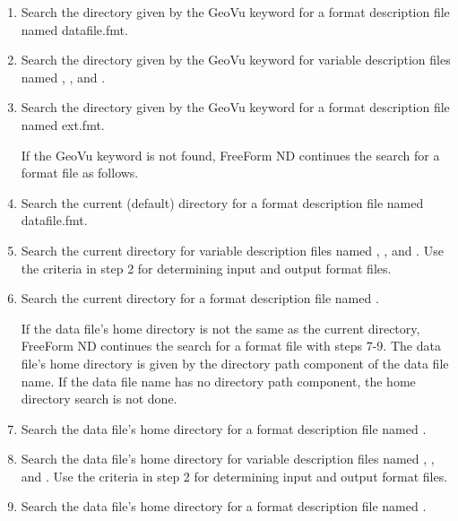 \begin{enumerate}
\item Search the directory given by the GeoVu keyword  for a
  format description file named datafile.fmt.
  
\item Search the directory given by the GeoVu keyword  for
  variable description files named , , and
  .
  
  
\item Search the directory given by the GeoVu keyword  for a
  format description file named ext.fmt.
  
  If the GeoVu keyword  is not found, FreeForm ND continues
  the search for a format file as follows.
  
\item Search the current (default) directory for a format description
  file named datafile.fmt.
  
\item Search the current directory for variable description files
  named , , and . Use the criteria
  in step 2 for determining input and output format files.
  
\item Search the current directory for a format description file named
  .
  
  If the data file's home directory is not the same as the current
  directory, FreeForm ND continues the search for a format file with
  steps 7-9. The data file's home directory is given by the directory
  path component of the data file name. If the data file name has no
  directory path component, the home directory search is not done.
  
\item Search the data file's home directory for a format description
  file named .
  
\item Search the data file's home directory for variable description
  files named , , and . Use the
  criteria in step 2 for determining input and output format files.
  
\item Search the data file's home directory for a format description
  file named .
\end{enumerate}


